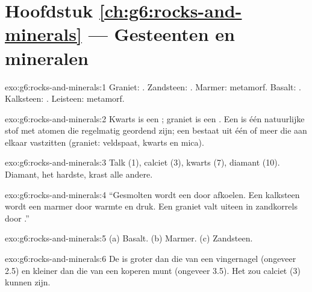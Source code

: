\section*{Hoofdstuk \ref{ch:g6:rocks-and-minerals} --- Gesteenten en mineralen}

\begin{solution}{exo:g6:rocks-and-minerals:1}
Graniet: . Zandsteen: . Marmer:
metamorf. Basalt: . Kalksteen: .
Leisteen: metamorf.
\end{solution}

\begin{solution}{exo:g6:rocks-and-minerals:2}
Kwarts is een ; graniet is een . Een  is één
natuurlijke stof met atomen die regelmatig geordend zijn; een 
bestaat uit één of meer  die aan elkaar vastzitten (graniet:
veldspaat, kwarts en mica).
\end{solution}

\begin{solution}{exo:g6:rocks-and-minerals:3}
Talk (1), calciet (3), kwarts (7), diamant (10). Diamant, het hardste,
krast alle andere.
\end{solution}

\begin{solution}{exo:g6:rocks-and-minerals:4}
``Gesmolten  wordt een  door afkoelen. Een
kalksteen wordt een marmer door warmte en druk. Een graniet valt uiteen in
zandkorrels door .''
\end{solution}

\begin{solution}{exo:g6:rocks-and-minerals:5}
(a) Basalt. (b) Marmer. (c) Zandsteen.
\end{solution}

\begin{solution}{exo:g6:rocks-and-minerals:6}
De  is groter dan die van een vingernagel (ongeveer 2.5) en kleiner
dan die van een koperen munt (ongeveer 3.5). Het zou calciet (3) kunnen
zijn.
\end{solution}

